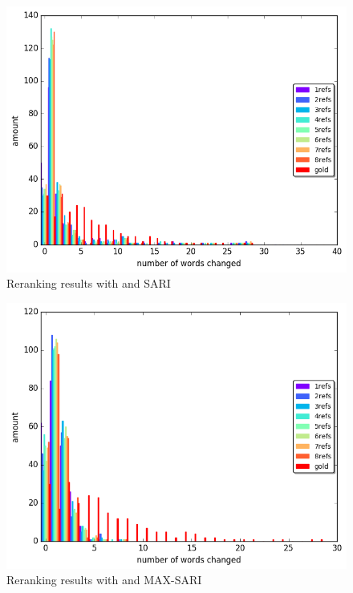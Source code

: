 \documentclass[letterpaper, 11pt]{article}
\begin{document}
\begin{figure}
\includegraphics[width=0.9\columnwidth]{nisioi_sari_words_differences_hist}
	\caption{Reranking results with  and SARI}

\end{figure}
\begin{figure}
	\includegraphics[width=0.9\columnwidth]{moses_max_words_differences_hist}
		\caption{Reranking results with  and MAX-SARI}
	
\end{figure}
\end{document}
